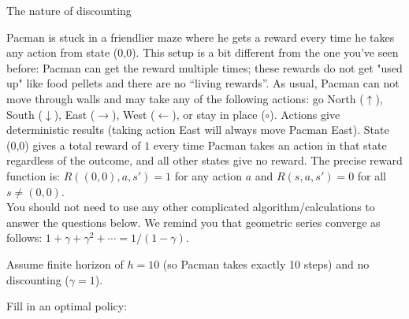 \begin{problem}[]{The nature of discounting}

Pacman is stuck in a friendlier maze where he gets a reward every time he takes any action from state (0,0). This setup is a bit different from the one you've seen before: Pacman can get the reward multiple times; these rewards do not get "used up" like food pellets and there are no ``living rewards''.  As usual, Pacman can not move through walls and may take any of the following actions: go North ($\uparrow$), South ($\downarrow$), East ($\rightarrow$), West ($\leftarrow$), or stay in place ($\circ$). Actions give deterministic results (taking action East will always move Pacman East). State (0,0) gives a total reward of $1$ every time Pacman takes an action in that state regardless of the outcome, and all other states give no reward. The precise reward function is: $R((0,0),a,s') = 1$ for any action $a$ and $R(s,a,s')=0$ for all $s \neq (0,0)$. \\

You should not need to use any other complicated algorithm/calculations to answer the questions below. We remind you that geometric series converge as follows:
$ 1 + \gamma + \gamma^2 + \cdots = 1/(1-\gamma)$.

\begin{question}[6]
Assume finite horizon of $h = 10$ (so Pacman takes exactly 10 steps) and no discounting ($\gamma = 1$).
\\

{\newcommand{\sep}{1cm}
\newcommand{\actionEast}{$\rightarrow$}
\newcommand{\actionWest}{$\leftarrow$}
\newcommand{\actionNorth}{$\uparrow$}
\newcommand{\actionSouth}{$\downarrow$}
\newcommand{\actionStay}{$\circ$}

\begin{minipage}[t]{.5\textwidth}
\centering

Fill in an optimal policy:\\



\end{minipage}}
\end{question}
\end{problem}
